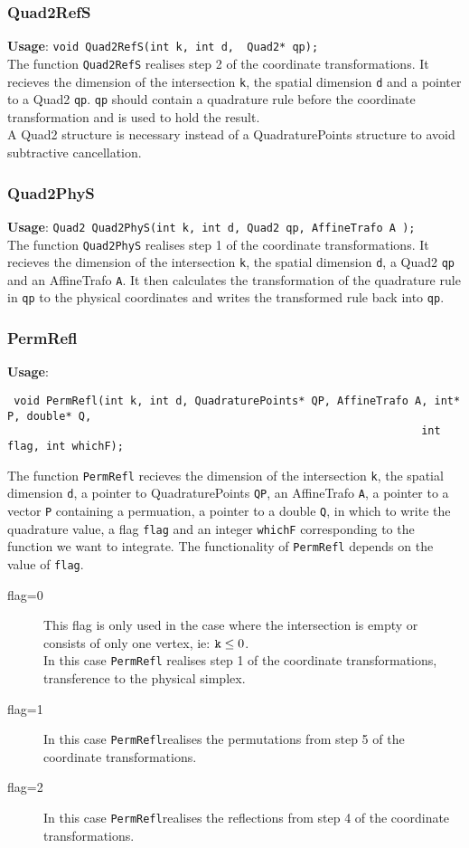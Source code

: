 \documentclass[a4paper,10pt]{article}
\begin{document}
\subsubsection{Quad2RefS}
\textbf{Usage}: \verb=void Quad2RefS(int k, int d,  Quad2* qp);=\\
The function \verb=Quad2RefS= realises step 2 of the coordinate transformations. It recieves the dimension
of the intersection \verb=k=, the spatial dimension \verb=d= and a pointer to a Quad2 \verb=qp=. \verb=qp=
should contain a quadrature rule before the coordinate transformation and is used to hold the result.\\
A Quad2 structure is necessary instead of a QuadraturePoints structure to avoid subtractive cancellation.
\subsubsection{Quad2PhyS}
\textbf{Usage}: \verb=Quad2 Quad2PhyS(int k, int d, Quad2 qp, AffineTrafo A );=\\
The function \verb=Quad2PhyS= realises step 1 of the coordinate transformations. It recieves the dimension
of the intersection \verb=k=, the spatial dimension \verb=d=, a Quad2 \verb=qp= and an AffineTrafo \verb=A=.
It then calculates the transformation of the quadrature rule in \verb=qp= to the physical coordinates and writes
the transformed rule back into \verb=qp=.
\subsubsection{PermRefl}
\textbf{Usage}: \begin{verbatim} void PermRefl(int k, int d, QuadraturePoints* QP, AffineTrafo A, int* P, double* Q,
                                                                int flag, int whichF);\end{verbatim}
The function \verb=PermRefl= recieves the dimension of the intersection \verb=k=, the spatial dimension
 \verb=d=, a pointer to QuadraturePoints \verb=QP=, an AffineTrafo \verb=A=, a pointer to a vector \verb=P=
containing a permuation, a pointer to a double \verb=Q=, in which to write the quadrature value, a flag \verb=flag=
and an integer \verb=whichF= corresponding to the function we want to integrate.
The functionality of \verb=PermRefl= depends on the value of \verb=flag=.
\begin{description}
\item[flag=0] This flag is only used in the case where the intersection is empty or consists of only one vertex,
               ie: $\verb=k=\leq 0$.\\
	       In this case \verb=PermRefl= realises step 1 of the coordinate transformations, transference to
               the physical simplex.
\item[flag=1] In this case \verb=PermRefl=realises the permutations from step 5 of the coordinate transformations. 
\item[flag=2] In this case \verb=PermRefl=realises the reflections from step 4 of the coordinate transformations.
\end{description}
\end{document}
